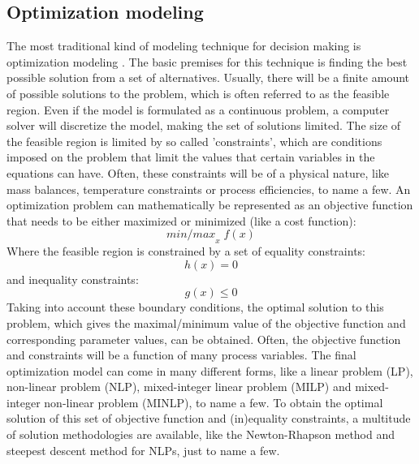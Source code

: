 \subsection{\large{Optimization modeling}}
The most traditional kind of modeling technique for decision making is optimization modeling \cite{optimization}. The basic premises for this technique is finding the best possible solution from a set of alternatives. Usually, there will be a finite amount of possible solutions to the problem, which is often referred to as the feasible region. Even if the model is formulated as a continuous problem, a computer solver will discretize the model, making the set of solutions limited. The size of the feasible region is limited by so called 'constraints', which are conditions imposed on the problem that limit the values that certain variables in the equations can have. Often, these constraints will be of a physical nature, like mass balances, temperature constraints or process efficiencies, to name a few.
\newline \newline \noindent
An optimization problem can mathematically be represented as an objective function that needs to be either maximized or minimized (like a cost function):
\begin{equation}
    {min/max}_{x} \; f(x)
\end{equation}
Where the feasible region is constrained by a set of equality constraints:
\begin{equation}
    h(x) = 0
\end{equation}
and inequality constraints:
\begin{equation}
    g(x) \leq 0
\end{equation}
Taking into account these boundary conditions, the optimal solution to this problem, which gives the maximal/minimum value of the objective function and corresponding parameter values, can be obtained. Often, the objective function and constraints will be a function of many process variables. The final optimization model can come in many different forms, like a linear problem (LP), non-linear problem (NLP), mixed-integer linear problem (MILP) and mixed-integer non-linear problem (MINLP), to name a few. To obtain the optimal solution of this set of objective function and (in)equality constraints, a multitude of solution methodologies are available, like the Newton-Rhapson method and steepest descent method for NLPs, just to name a few.
\newline \newline \noindent
